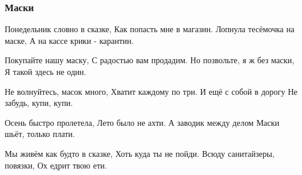  
 
 

\subsubsection{Маски}
\label{sec:poetry.rus.sergei_maklaud.maski}

Понедельник словно в сказке,
Как попасть мне в магазин.
Лопнула тесёмочка на маске,
А на кассе крики - карантин.

Покупайте нашу маску,
С радостью вам продадим.
Но позвольте, я ж без маски,
Я такой здесь не один.

Не волнуйтесь, масок много,
Хватит каждому по три.
И ещё с собой в дорогу
Не забудь, купи, купи.

Осень быстро пролетела, 
Лето было не ахти. 
А заводик между делом
Маски шьёт, только плати.

Мы живём как будто в сказке,
Хоть куда ты не пойди.
Всюду санитайзеры, повязки,
Ох едрит твою ети.

